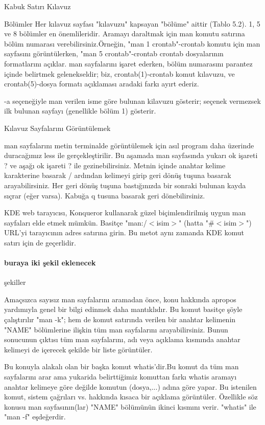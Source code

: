\begin{section}{Kabuk Satırı Kılavuz}
\begin{subsection}{Bölümler}
Her kılavuz sayfası "kılavuzu" kapsayan "bölüme" aittir (Tablo 5.2). 1, 5 ve 8 bölümler en önemlileridir. Aramayı daraltmak için man komutu satırına bölüm numarası verebilirsiniz.Örneğin, "man 1 crontab"-crontab komutu için man sayfasını görüntülerken, "man 5 crontab"-crontab crontab dosyalarının formatlarını açıklar. man sayfalarını işaret ederken, bölüm numarasını parantez içinde belirtmek gelenekseldir; biz, crontab(1)-crontab komut kılavuzu, ve crontab(5)-dosya formatı açıklaması aradaki farkı ayırt ederiz.

-a seçeneğiyle man verilen isme göre bulunan kilavuzu gösterir; seçenek vermezsek ilk bulunan sayfayı (genellikle bölüm 1) gösterir.
\end{subsection}
\begin{subsection}{Kılavuz Sayfalarını Görüntülemek }

man sayfalarını metin terminalde görüntülemek için asıl program daha üzerinde duracağımız less ile gerçekleştirilir. Bu aşamada man sayfasında yukarı ok işareti ? ve aşağı ok işareti ? ile gezinebilirsiniz. Metnin içinde anahtar kelime karakterine basarak / ardından kelimeyi girip geri dönüş tuşuna basarak arayabilirsiniz. Her geri dönüş tuşuna bastığınızda bir sonraki bulunan kayda sıçrar (eğer varsa). Kabuğa q tusuna basarak geri dönebilirsiniz.

KDE web tarayıcısı, Konqueror kullanarak güzel biçimlendirilmiş uygun man sayfaları elde etmek mümkün. Basitçe "man:/$<$isim$>$" (hatta "\#$<$isim$>$") URL'yi tarayıcının adres satırına girin. Bu metot aynı zamanda KDE komut satırı için de geçerlidir.

\paragraph{buraya iki şekil eklenecek}{şekiller}

Amaçsızca sayısız man sayfalarını aramadan önce, konu hakkında apropos yardımıyla genel bir bilgi edinmek daha mantıklıdır. Bu komut basitçe şöyle çalıştırılır "man -k"; hem de komut satırında verilen bir anahtar kelimenin "NAME" bölümlerine ilişkin tüm man sayfalarını arayabilirsiniz. Bunun sonucunun çıktısı tüm man sayfalarını, adı veya açıklama kısmında anahtar kelimeyi de içerecek şekilde bir liste görüntüler.

Bu konuyla alakalı olan bir başka komut whatis'dir.Bu komut da tüm man sayfalarını arar ama yukarida belirttiğimiz komuttan farkı whatis aramayı anahtar kelimeye göre değilde komutun (dosya,...) adına göre yapar. Bu istenilen komut, sistem çağrıları vs. hakkında kısaca bir açıklama görüntüler. Özellikle söz konusu man sayfasının(lar) "NAME" bölümünün ikinci  kısmını verir. "whatis" ile "man -f" eşdeğerdir.

\end{subsection}
\end{section}
